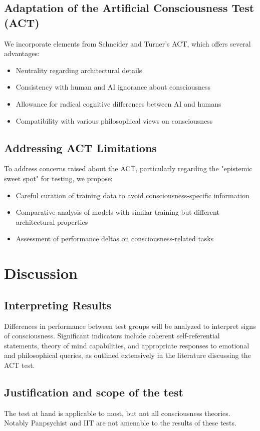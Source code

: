 \documentclass{article}
\begin{document}
\subsection{Adaptation of the Artificial Consciousness Test (ACT)}
We incorporate elements from Schneider and Turner's ACT, which offers several advantages:
\begin{itemize}
    \item Neutrality regarding architectural details
    \item Consistency with human and AI ignorance about consciousness
    \item Allowance for radical cognitive differences between AI and humans
    \item Compatibility with various philosophical views on consciousness
\end{itemize}

\subsection{Addressing ACT Limitations}
To address concerns raised about the ACT, particularly regarding the "epistemic sweet spot" for testing, we propose:
\begin{itemize}
    \item Careful curation of training data to avoid consciousness-specific information
    \item Comparative analysis of models with similar training but different architectural properties
    \item Assessment of performance deltas on consciousness-related tasks
\end{itemize}

\section{Discussion}
\subsection{Interpreting Results}
Differences in performance between test groups will be analyzed to interpret signs of consciousness. Significant indicators include coherent self-referential statements, theory of mind capabilities, and appropriate responses to emotional and philosophical queries, as outlined extensively in the literature discussing the ACT test.
\subsection{Justification and scope of the test}
The test at hand is applicable to most, but not all consciousness theories. Notably Panpsychist and IIT are not amenable to the results of these tests.
\end{document}
